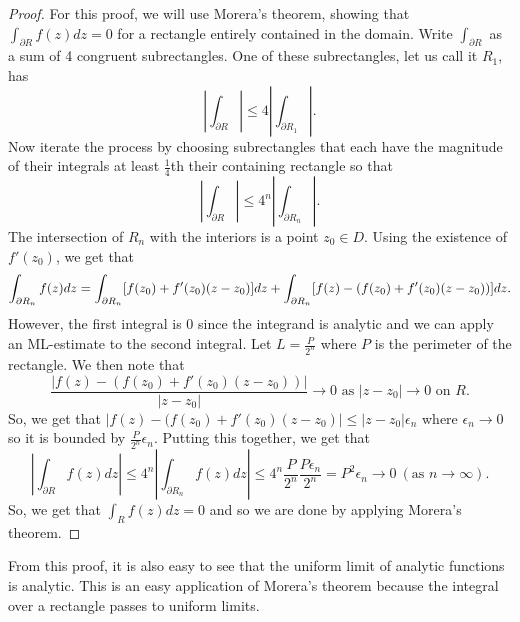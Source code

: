 \documentclass[11pt,leqno,oneside]{amsart}
\numberwithin{thm}{section}
\begin{document}
  \begin{proof}
    For this proof, we will use Morera's theorem, showing that
    $\int_{\partial R} f(z)dz = 0$ for a rectangle entirely contained
    in the domain. Write $\int_{\partial R}$ as a sum of 4
    congruent subrectangles. One of these subrectangles, let us call it $R_1$,
    has \[
      \left|
        \int_{\partial R}
      \right| \leq
      4\left|
        \int_{\partial R_1}
      \right|.
    \]
    Now iterate the process by choosing subrectangles that each have
    the magnitude of their integrals at least $\frac{1}{4}$th their containing rectangle so that \[
      \left|
        \int_{\partial R}
      \right| \leq
      4^n\left|
        \int_{\partial R_n}
      \right|.
    \]
    The intersection of $R_n$ with the interiors is a point $z_0 \in
    D$. Using the existence of $f'(z_0)$, we get that \[
      \int_{\partial R_n} f(z)dz = \int_{\partial R_n} [f(z_0) + f'(z_0)(z-z_0)]dz +
      \int_{\partial R_n} [f(z) - (f(z_0) + f'(z_0)(z-z_0))]dz.
    \]
    However, the first integral is 0 since the integrand is analytic
    and we can apply an ML-estimate to the second integral. Let $L =
    \frac{P}{2^n}$ where $P$ is the perimeter of the rectangle. We
    then note that \[
      \frac{|f(z)-(f(z_0) + f'(z_0)(z-z_0))|}{|z-z_0|} \to 0 \text{ as
      } |z-z_0| \to 0 \text{ on } R.
    \]
    So, we get that $|f(z)-(f(z_0) + f'(z_0)(z-z_0)| \leq |z-z_0|
    \epsilon_n$ where $\epsilon_n \to 0$ so it is bounded by
    $\frac{P}{2^n}\epsilon_n$. Putting this together, we get that \[
      \left|
        \int_{\partial R} f(z)dz
      \right| \leq 4^n
      \left|
        \int_{\partial R_n} f(z)dz
      \right| \leq 4^n \frac{P}{2^n}\frac{P \epsilon_n}{2^n} = P^2
      \epsilon_n \to 0 ~ (\text{as }n \to \infty).
    \]
    So, we get that $\int_R f(z)dz = 0$ and so we are done by applying
    Morera's theorem.
  \end{proof}
  From this proof, it is also easy to see that the uniform limit of
  analytic functions is analytic. This is an easy application of
  Morera's theorem because the integral over a rectangle passes to
  uniform limits.
\end{document}

